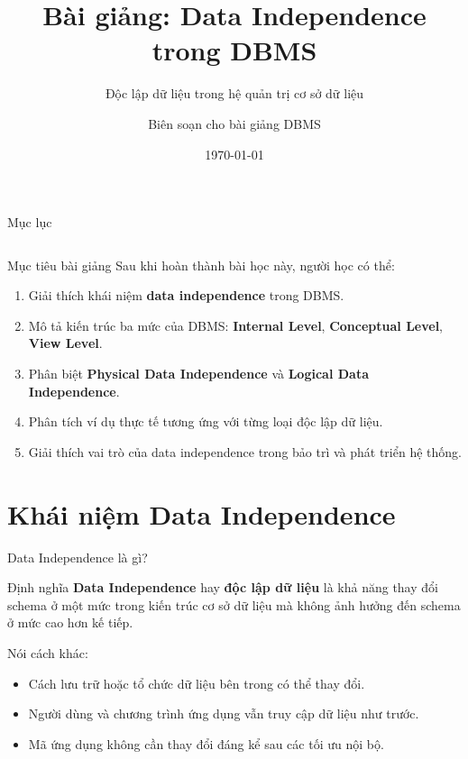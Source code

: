 \documentclass[aspectratio=169,11pt]{beamer}
\title[Data Independence trong DBMS]{Bài giảng: Data Independence trong DBMS}
\subtitle{Độc lập dữ liệu trong hệ quản trị cơ sở dữ liệu}
\author{Biên soạn cho bài giảng DBMS}
\date{\today}
\begin{document}
\begin{frame}
  \titlepage
\end{frame}

\begin{frame}{Mục lục}
\begin{columns}[T,totalwidth=\textwidth]
  \tableofcontents[sections={1-4},hideallsubsections]
  \tableofcontents[sections={5-8},hideallsubsections]
\end{columns}
\end{frame}

\begin{frame}{Mục tiêu bài giảng}
Sau khi hoàn thành bài học này, người học có thể:
\begin{enumerate}
  \item Giải thích khái niệm \textbf{data independence} trong DBMS.
  \item Mô tả kiến trúc ba mức của DBMS: \textbf{Internal Level}, \textbf{Conceptual Level}, \textbf{View Level}.
  \item Phân biệt \textbf{Physical Data Independence} và \textbf{Logical Data Independence}.
  \item Phân tích ví dụ thực tế tương ứng với từng loại độc lập dữ liệu.
  \item Giải thích vai trò của data independence trong bảo trì và phát triển hệ thống.
\end{enumerate}
\end{frame}

\section{Khái niệm Data Independence}

\begin{frame}{Data Independence là gì?}
\begin{block}{Định nghĩa}
\textbf{Data Independence} hay \textbf{độc lập dữ liệu} là khả năng thay đổi schema ở một mức trong kiến trúc cơ sở dữ liệu mà không ảnh hưởng đến schema ở mức cao hơn kế tiếp.
\end{block}

\vspace{0.3cm}
Nói cách khác:
\begin{itemize}
  \item Cách lưu trữ hoặc tổ chức dữ liệu bên trong có thể thay đổi.
  \item Người dùng và chương trình ứng dụng vẫn truy cập dữ liệu như trước.
  \item Mã ứng dụng không cần thay đổi đáng kể sau các tối ưu nội bộ.
\end{itemize}
\end{frame}
\end{document}
